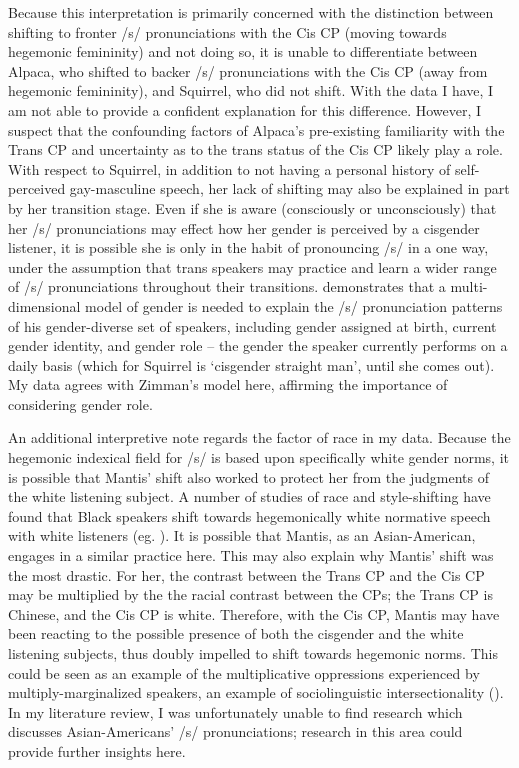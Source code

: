 \documentclass[12pt,twoside]{reedthesis}
\begin{document}
Because this interpretation is primarily concerned with the distinction between shifting to fronter /s/ pronunciations with the Cis CP (moving towards hegemonic femininity) and not doing so, it is unable to differentiate between Alpaca, who shifted to backer /s/ pronunciations with the Cis CP (away from hegemonic femininity), and Squirrel, who did not shift. With the data I have, I am not able to provide a confident explanation for this difference. However, I suspect that the confounding factors of Alpaca's pre-existing familiarity with the Trans CP and uncertainty as to the trans status of the Cis CP likely play a role. With respect to Squirrel, in addition to not having a personal history of self-perceived gay-masculine speech, her lack of shifting may also be explained in part by her transition stage. Even if she is aware (consciously or unconsciously) that her /s/ pronunciations may effect how her gender is perceived by a cisgender listener, it is possible she is only in the habit of pronouncing /s/ in a one way, under the assumption that trans speakers may practice and learn a wider range of /s/ pronunciations throughout their transitions. \textcite{zimman_gender_2021} demonstrates that a multi-dimensional model of gender is needed to explain the /s/ pronunciation patterns of his gender-diverse set of speakers, including gender assigned at birth, current gender identity, and gender role -- the gender the speaker currently performs on a daily basis (which for Squirrel is `cisgender straight man', until she comes out). My data agrees with Zimman's model here, affirming the importance of considering gender role.

An additional interpretive note regards the factor of race in my data. Because the hegemonic indexical field for /s/ is based upon specifically white gender norms, it is possible that Mantis' shift also worked to protect her from the judgments of the white listening subject. A number of studies of race and style-shifting have found that Black speakers shift towards hegemonically white normative speech with white listeners (eg. \cite{rickford_addressee_1994}). It is possible that Mantis, as an Asian-American, engages in a similar practice here. This may also explain why Mantis' shift was the most drastic. For her, the contrast between the Trans CP and the Cis CP may be multiplied by the the racial contrast between the CPs; the Trans CP is Chinese, and the Cis CP is white. Therefore, with the Cis CP, Mantis may have been reacting to the possible presence of both the cisgender and the white listening subjects, thus doubly impelled to shift towards hegemonic norms. This could be seen as an example of the multiplicative oppressions experienced by multiply-marginalized speakers, an example of sociolinguistic intersectionality (\cite{miles-hercules_real_2022}). In my literature review, I was unfortunately unable to find research which discusses Asian-Americans' /s/ pronunciations; research in this area could provide further insights here.
\end{document}
